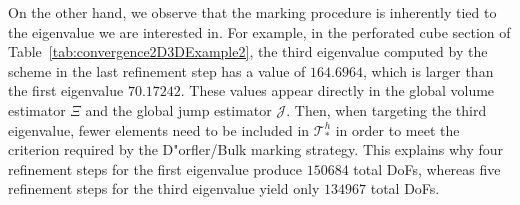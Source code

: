\documentclass[final,reqno]{elsarticle}
\begin{document}
On the other hand, we observe that the marking procedure is inherently tied to the eigenvalue we are interested in. For example, in the perforated cube section of Table~\ref{tab:convergence2D3DExample2}, the third eigenvalue computed by the scheme in the last refinement step has a value of $164.6964$, which is larger than the first eigenvalue $70.17242$. These values appear directly in the global volume estimator $\Xi$ and the global jump estimator $\mathcal{J}$. Then, when targeting the third eigenvalue, fewer elements need to be included in $\mathcal{T}_*^h$ in order to meet the criterion required by the D"orfler/Bulk marking strategy. This explains why four refinement steps for the first eigenvalue produce $\num{150684}$ total DoFs, whereas five refinement steps for the third eigenvalue yield only $\num{134967}$ total DoFs.
\end{document}
